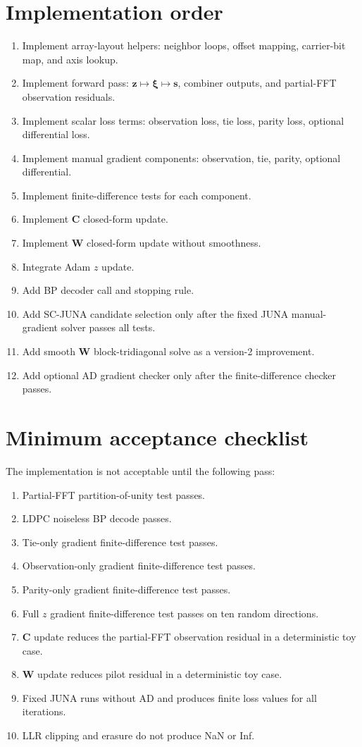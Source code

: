 \documentclass[11pt]{article}
\begin{document}
\section{Implementation order}

\begin{enumerate}[label=\textbf{Step \arabic*.},leftmargin=*]
\item Implement array-layout helpers: neighbor loops, offset mapping, carrier-bit map, and axis lookup.
\item Implement forward pass: $\bm z\mapsto\bm\xi\mapsto\mathbf s$, combiner outputs, and partial-FFT observation residuals.
\item Implement scalar loss terms: observation loss, tie loss, parity loss, optional differential loss.
\item Implement manual gradient components: observation, tie, parity, optional differential.
\item Implement finite-difference tests for each component.
\item Implement $\mathbf C$ closed-form update.
\item Implement $\mathbf W$ closed-form update without smoothness.
\item Integrate Adam $z$ update.
\item Add BP decoder call and stopping rule.
\item Add SC-JUNA candidate selection only after the fixed JUNA manual-gradient solver passes all tests.
\item Add smooth $\mathbf W$ block-tridiagonal solve as a version-2 improvement.
\item Add optional AD gradient checker only after the finite-difference checker passes.
\end{enumerate}

\section{Minimum acceptance checklist}

The implementation is not acceptable until the following pass:
\begin{enumerate}[leftmargin=*]
\item Partial-FFT partition-of-unity test passes.
\item LDPC noiseless BP decode passes.
\item Tie-only gradient finite-difference test passes.
\item Observation-only gradient finite-difference test passes.
\item Parity-only gradient finite-difference test passes.
\item Full $z$ gradient finite-difference test passes on ten random directions.
\item $\mathbf C$ update reduces the partial-FFT observation residual in a deterministic toy case.
\item $\mathbf W$ update reduces pilot residual in a deterministic toy case.
\item Fixed JUNA runs without AD and produces finite loss values for all iterations.
\item LLR clipping and erasure do not produce NaN or Inf.
\end{enumerate}
\end{document}
